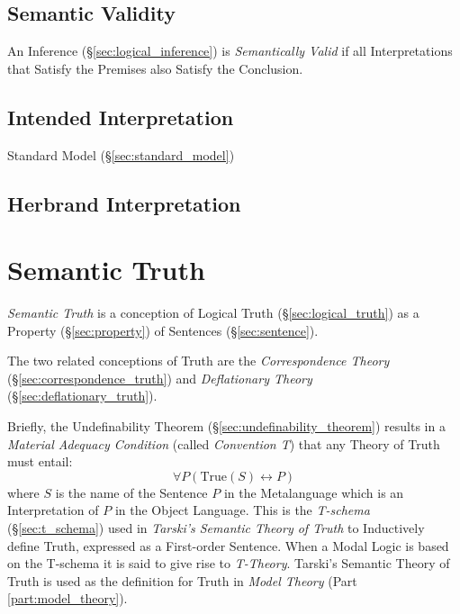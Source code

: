 \subsection{Semantic Validity}\label{sec:semantic_validity}

An Inference (\S\ref{sec:logical_inference}) is \emph{Semantically
  Valid} if all Interpretations that Satisfy the Premises also Satisfy
the Conclusion. \cite{gamut91}



\subsection{Intended Interpretation}\label{sec:intended_interpretation}

Standard Model (\S\ref{sec:standard_model})



\subsection{Herbrand Interpretation}\label{sec:herbrand_interpretation}



\section{Semantic Truth}\label{sec:semantic_truth}

\emph{Semantic Truth} is a conception of Logical Truth
(\S\ref{sec:logical_truth}) as a Property (\S\ref{sec:property}) of
Sentences (\S\ref{sec:sentence}).

The two related conceptions of Truth are the \emph{Correspondence
  Theory} (\S\ref{sec:correspondence_truth}) and \emph{Deflationary
  Theory} (\S\ref{sec:deflationary_truth}).

Briefly, the Undefinability Theorem
(\S\ref{sec:undefinability_theorem}) results in a \emph{Material
  Adequacy Condition} (called \emph{Convention T}) that any Theory of
Truth must entail:
\[
    \forall P (\mathrm{True}(S) \leftrightarrow P)
\]
where $S$ is the name of the Sentence $P$ in the Metalanguage which is
an Interpretation of $P$ in the Object Language. This is the
\emph{T-schema} (\S\ref{sec:t_schema}) used in \emph{Tarski's Semantic
  Theory of Truth} to Inductively define Truth, expressed as a
First-order Sentence. When a Modal Logic is based on the T-schema it
is said to give rise to \emph{T-Theory}. Tarski's Semantic Theory of
Truth is used as the definition for Truth in \emph{Model Theory}
(Part \ref{part:model_theory}).

